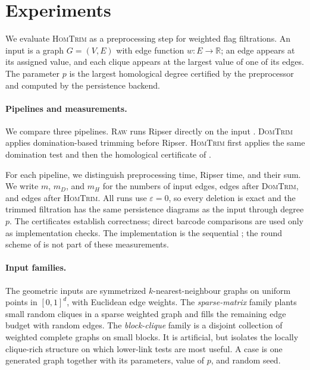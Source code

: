 \documentclass[11pt,letterpaper]{article}
\theoremstyle{definition}
\newcommand{\eps}{\varepsilon}
\begin{document}
\section{Experiments}
\label{sec:experiments}

We evaluate \textsc{HomTrim} as a preprocessing step for weighted flag
filtrations. An input is a graph $G=(V,E)$ with edge function
$w:E\to\mathbb R$; an edge appears at its assigned value, and each clique
appears at the largest value of one of its edges. The parameter $p$ is the
largest homological degree certified by the preprocessor and computed by the
persistence backend.

\paragraph{Pipelines and measurements.}
We compare three pipelines. \textsc{Raw} runs Ripser directly on the input
\cite{Bauer2021}. \textsc{DomTrim} applies domination-based trimming before
Ripser. \textsc{HomTrim} first applies the same domination test and then the
homological certificate of .

For each pipeline, we distinguish preprocessing time, Ripser time, and their
sum. We write $m$, $m_D$, and $m_H$ for the numbers of input edges, edges after
\textsc{DomTrim}, and edges after \textsc{HomTrim}. All runs use $\eps=0$, so
every deletion is exact and the trimmed filtration has the same persistence
diagrams as the input through degree $p$. The certificates establish
correctness; direct barcode comparisons are used only as implementation
checks. The implementation is the sequential ; the round
scheme of  is not part of these measurements.

\paragraph{Input families.}
The geometric inputs are symmetrized $k$-nearest-neighbour graphs on uniform
points in $[0,1]^d$, with Euclidean edge weights. The \emph{sparse-matrix}
family plants small random cliques in a sparse weighted graph and fills the
remaining edge budget with random edges. The \emph{block-clique} family is a
disjoint collection of weighted complete graphs on small blocks. It is
artificial, but isolates the locally clique-rich structure on which lower-link
tests are most useful. A case is one generated graph together with its
parameters, value of $p$, and random seed.
\end{document}
